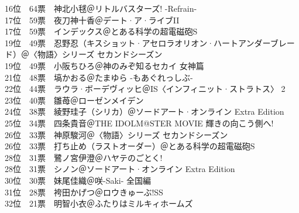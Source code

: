 {    16位　64票　神北小毬＠リトルバスターズ! -Refrain-                                                               \\
    17位　59票　夜刀神十香＠デート·ア·ライブII                                                                    \\
    17位　59票　インデックス＠とある科学の超電磁砲S                                                                 \\
    19位　49票　忍野忍（キスショット·アセロラオリオン·ハートアンダーブレード）＠〈物語〉シリーズ セカンドシーズン \\
    19位　49票　小阪ちひろ＠神のみぞ知るセカイ 女神篇                                                               \\
    21位　48票　塙かおる＠たまゆら -もあぐれっしぶ-                                                                 \\
    22位　44票　ラウラ·ボーデヴィッヒ＠IS〈インフィニット·ストラトス〉 2                                          \\
    23位　40票　雛苺＠ローゼンメイデン                                                                              \\
    24位　38票　綾野珪子（シリカ）＠ソードアート·オンライン Extra Edition                                          \\
    25位　34票　四条貴音＠THE IDOLM@STER MOVIE 輝きの向こう側へ!                                                    \\
    26位　33票　神原駿河＠〈物語〉シリーズ セカンドシーズン                                                         \\
    26位　33票　打ち止め（ラストオーダー）＠とある科学の超電磁砲S                                                   \\
    28位　31票　鷺ノ宮伊澄＠ハヤテのごとく!                                                                         \\
    28位　31票　シノン＠ソードアート·オンライン Extra Edition                                                      \\
    30位　30票　妹尾佳織＠咲-Saki- 全国編                                                                           \\
    31位　28票　袴田かげつ＠ロウきゅーぶ!SS                                                                         \\
    32位　21票　明智小衣＠ふたりはミルキィホームズ                                                                  \\
}
